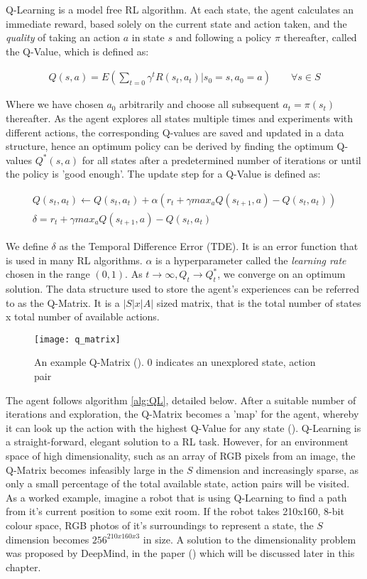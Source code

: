 Q-Learning is a model free RL algorithm. At each state, the agent calculates an immediate reward,
based solely on the current state and action taken, and the \textit{quality} of taking an action $a$
in state $s$ and following a policy $\pi$ thereafter, called the Q-Value, which is defined as:

\begin{align}
    \label{equ:Q}
    Q(s, a) = E(\sum_{t=0}\gamma^tR(s_t, a_t) | s_0 = s, a_0 = a) \qquad \forall s \in S
\end{align}

Where we have chosen $a_0$ arbitrarily and
choose all subsequent $a_t = \pi(s_t)$ thereafter. As the agent explores all states multiple times
and experiments with different actions, the corresponding Q-values are saved and updated in a data
structure, hence an optimum policy can be derived by finding the optimum Q-values $Q^*(s, a)$ for all states after a predetermined number of iterations or until the policy is 'good enough'. The update step for a Q-Value is defined as:

\begin{gather}
    \label{equ:QUpdate}
    Q(s_t, a_t) \leftarrow Q(s_t, a_t) + \alpha(r_t + \gamma max_aQ(s_{t+1}, a) - Q(s_t, a_t)) \\
    \label{equ:TDE}
    \delta = r_t + \gamma max_aQ(s_{t+1}, a) - Q(s_t, a_t)
\end{gather}

We define $\delta$ as the Temporal Difference Error (TDE). It is an error function that is used in many RL algorithms. $\alpha$ is a hyperparameter called the \textit{learning rate} chosen in the range $(0, 1)$. As $t \rightarrow \infty, Q_t \rightarrow Q^*_t$, we converge on an optimum solution. The data structure used to store the agent's experiences can be referred to as the Q-Matrix. It is a $|S| x |A|$ sized matrix, that is the total number of states x total number of available actions.

\begin{figure}[h]
    \texttt{[image: q\_matrix]}
    \centering
    \caption{An example Q-Matrix (\citet{qmatrix}). 0 indicates an unexplored state, action pair}
\end{figure}

The agent follows algorithm \ref{alg:QL}, detailed below.
After a suitable number of iterations and exploration, the Q-Matrix becomes a 'map' for the agent,
whereby it can look up the action with the highest Q-Value for any state (\citet{qlearning}).
Q-Learning is a straight-forward, elegant solution to a RL task. However, for an environment space
of high dimensionality, such as an array of RGB pixels from an image, the Q-Matrix becomes
infeasibly large in the $S$ dimension and increasingly sparse, as only a small percentage of the
total available state, action pairs will be visited. As a worked example, imagine a robot that is
using Q-Learning to find a path from it's current position to some exit room. If the robot takes
210x160, 8-bit colour space, RGB photos of it's surroundings to represent a state, the $S$ dimension
becomes $256^{210x160x3}$ in size. A solution to the dimensionality problem was
proposed by DeepMind, in the paper (\citet{deepmind1}) which will be discussed later in this chapter.

